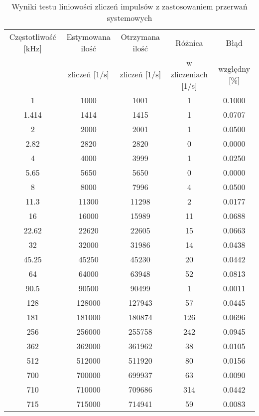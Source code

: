 \begin{appendices}
\begin{table}[h]
        \centering
        \caption{Wyniki testu liniowości zliczeń impulsów  z zastosowaniem przerwań systemowych}
        \label{rts table}
        \begin{tabular}{|c|c|c|c|c|}  
                \hline 
                Częstotliwość [kHz] & Estymowana ilość   & Otrzymana ilość & Różnica& Błąd \\ 
                &  zliczeń [1/s] &  zliczeń  [1/s]& w zliczeniach [1/s] & względny [\%]\\ \hline
                1 & 1000 & 1001 & 1 & 0.1000\\ \hline 
                1.414 & 1414 & 1415 & 1 & 0.0707\\ \hline 
                2 & 2000 & 2001 & 1 & 0.0500\\ \hline 
                2.82 & 2820 & 2820 & 0 & 0.0000\\ \hline 
                4 & 4000 & 3999 & 1 & 0.0250\\ \hline 
                5.65 & 5650 & 5650 & 0 & 0.0000\\ \hline 
                8 & 8000 & 7996 & 4 & 0.0500\\ \hline 
                11.3 & 11300 & 11298 & 2 & 0.0177\\ \hline 
                16 & 16000 & 15989 & 11 & 0.0688\\ \hline 
                22.62 & 22620 & 22605 & 15 & 0.0663\\ \hline 
                32 & 32000 & 31986 & 14 & 0.0438\\ \hline 
                45.25 & 45250 & 45230 & 20 & 0.0442\\ \hline 
                64 & 64000 & 63948 & 52 & 0.0813\\ \hline 
                90.5 & 90500 & 90499 & 1 & 0.0011\\ \hline 
                128 & 128000 & 127943 & 57 & 0.0445\\ \hline 
                181 & 181000 & 180874 & 126 & 0.0696\\ \hline 
                256 & 256000 & 255758 & 242 & 0.0945\\ \hline 
                362 & 362000 & 361962 & 38 & 0.0105\\ \hline 
                512 & 512000 & 511920 & 80 & 0.0156\\ \hline 
                700 & 700000 & 699937 & 63 & 0.0090\\ \hline 
                710 & 710000 & 709686 & 314 & 0.0442\\ \hline 
                715 & 715000 & 714941 & 59 & 0.0083\\ \hline
        \end{tabular}
\end{table}


\end{appendices}
